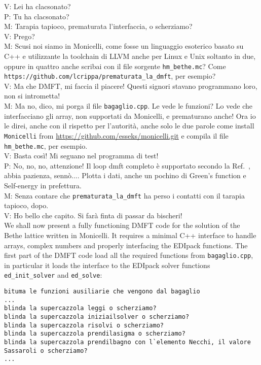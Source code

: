 \documentclass[preprint,3p,10pt]{elsarticle}
\def\NAME{{\rm EDIpack}\xspace}
\begin{document}
\noindent
V: Lei ha clacsonato?\\
P: Tu ha clacsonato?\\
M: Tarapia tapioco, prematurata l'interfaccia, o scherziamo?\\
V: Prego?\\
M: Scusi noi siamo in Monicelli, come fosse un linguaggio esoterico
basato su C++ e utilizzante la toolchain di LLVM anche per Linux e
Unix soltanto in due, oppure in quattro anche scribai con il file
sorgente {\tt hm\_bethe.mc}?  Come {\tt
  https://github.com/lcrippa/prematurata\_la\_dmft}, per esempio?\\
V: Ma che DMFT, mi faccia il piacere! Questi signori stavano
programmano loro, non si intrometta!\\
M: Ma no, dico, mi porga il file {\tt bagaglio.cpp}. Le vede le
funzioni? Lo vede che interfacciano gli array, non supportati da
Monicelli, e prematurano anche! 
Ora io le direi, anche con il rispetto per l'autorità, anche solo le
due parole come install {\tt Monicelli} from
\href{github.com/esseks/monicelli.git}{https://github.com/esseks/monicelli.git}
e compila il file {\tt hm\_bethe.mc}, per esempio.\\
V: Basta così! Mi seguano nel programma di test!\\
P: No, no, no, attenzione! Il loop dmft completo \`e supportato
secondo la Ref.~\cite{Georges1996RMP}, abbia pazienza,
senn\`o.... Plotta i dati, anche un pochino di Green's function e
Self-energy in prefettura.\\
M: Senza contare che {\tt prematurata\_la\_dmft} ha perso i contatti con il tarapia tapioco, dopo.\\
V: Ho bello che capito. Si farà finta di passar da bischeri!\\

We shall now present a fully functioning DMFT code for
the solution of the Bethe lattice written in Monicelli. It requires a minimal C++
interface to handle arrays, complex numbers and properly interfacing
the EDIpack functions.
The first part of the DMFT code load all the required functions from
{\tt bagaglio.cpp}, in particular it loads the interface to the \NAME
solver functions {\tt ed\_init\_solver} and {\tt ed\_solve}:

\begin{lstlisting}[style=cstyle]
bituma le funzioni ausiliarie che vengono dal bagaglio
...
blinda la supercazzola leggi o scherziamo?
blinda la supercazzola iniziailsolver o scherziamo?
blinda la supercazzola risolvi o scherziamo?
blinda la supercazzola prendilasigma o scherziamo?
blinda la supercazzola prendilbagno con l`elemento Necchi, il valore Sassaroli o scherziamo?
...
\end{lstlisting}
\end{document}
